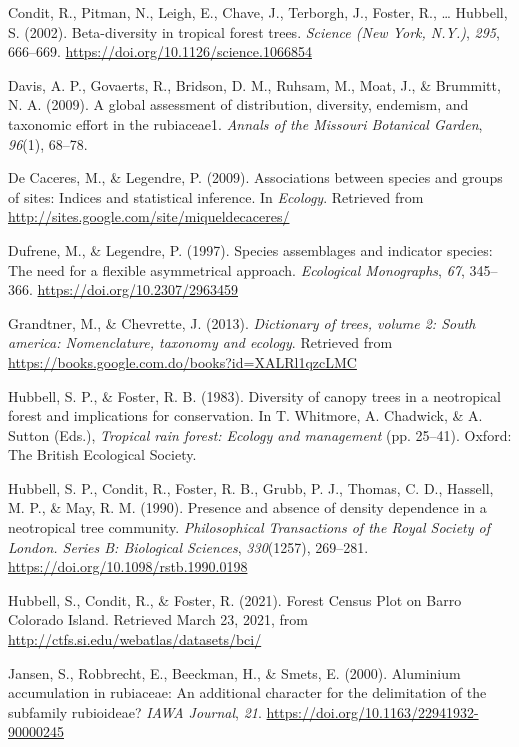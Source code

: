 \documentclass[11pt,]{article}
\begin{document}
\hypertarget{ref-article_condit}{}
Condit, R., Pitman, N., Leigh, E., Chave, J., Terborgh, J., Foster, R.,
\ldots{} Hubbell, S. (2002). Beta-diversity in tropical forest trees.
\emph{Science (New York, N.Y.)}, \emph{295}, 666--669.
\url{https://doi.org/10.1126/science.1066854}

\hypertarget{ref-davis2009global}{}
Davis, A. P., Govaerts, R., Bridson, D. M., Ruhsam, M., Moat, J., \&
Brummitt, N. A. (2009). A global assessment of distribution, diversity,
endemism, and taxonomic effort in the rubiaceae1. \emph{Annals of the
Missouri Botanical Garden}, \emph{96}(1), 68--78.

\hypertarget{ref-cita_indicspecies}{}
De Caceres, M., \& Legendre, P. (2009). Associations between species and
groups of sites: Indices and statistical inference. In \emph{Ecology}.
Retrieved from \url{http://sites.google.com/site/miqueldecaceres/}

\hypertarget{ref-dufrene_legendre}{}
Dufrene, M., \& Legendre, P. (1997). Species assemblages and indicator
species: The need for a flexible asymmetrical approach. \emph{Ecological
Monographs}, \emph{67}, 345--366. \url{https://doi.org/10.2307/2963459}

\hypertarget{ref-grandtner2013dictionary}{}
Grandtner, M., \& Chevrette, J. (2013). \emph{Dictionary of trees,
volume 2: South america: Nomenclature, taxonomy and ecology}. Retrieved
from \url{https://books.google.com.do/books?id=XALRl1qzcLMC}

\hypertarget{ref-hubell_foster_1983}{}
Hubbell, S. P., \& Foster, R. B. (1983). Diversity of canopy trees in a
neotropical forest and implications for conservation. In T. Whitmore, A.
Chadwick, \& A. Sutton (Eds.), \emph{Tropical rain forest: Ecology and
management} (pp. 25--41). Oxford: The British Ecological Society.

\hypertarget{ref-hubell_et_all_1990}{}
Hubbell, S. P., Condit, R., Foster, R. B., Grubb, P. J., Thomas, C. D.,
Hassell, M. P., \& May, R. M. (1990). Presence and absence of density
dependence in a neotropical tree community. \emph{Philosophical
Transactions of the Royal Society of London. Series B: Biological
Sciences}, \emph{330}(1257), 269--281.
\url{https://doi.org/10.1098/rstb.1990.0198}

\hypertarget{ref-web_bci}{}
Hubbell, S., Condit, R., \& Foster, R. (2021). Forest Census Plot on
Barro Colorado Island. Retrieved March 23, 2021, from
\url{http://ctfs.si.edu/webatlas/datasets/bci/}

\hypertarget{ref-article}{}
Jansen, S., Robbrecht, E., Beeckman, H., \& Smets, E. (2000). Aluminium
accumulation in rubiaceae: An additional character for the delimitation
of the subfamily rubioideae? \emph{IAWA Journal}, \emph{21}.
\url{https://doi.org/10.1163/22941932-90000245}
\end{document}
